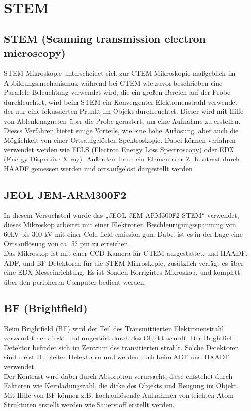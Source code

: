 \section{STEM}

\subsection{STEM (Scanning transmission electron microscopy)}

STEM-Mikroskopie unterscheidet sich zur CTEM-Mikroskopie maßgeblich im Abbildungsmechanismus, während bei CTEM wie zuvor beschrieben eine Parallele Beleuchtung verwendet wird, die ein großen Bereich auf der Probe durchleuchtet, wird beim STEM ein Konvergenter Elektronenstrahl verwendet der nur eine fokussierten Prunkt im Objekt durchleuchtet. Dieser wird mit Hilfe von Ablenkmagneten über die Probe gerastert, um eine Aufnahme zu erstellen. Dieses Verfahren bietet einige Vorteile, wie eine hohe Auflösung, aber auch die Möglichkeit von einer Ortsaufgelösten Spektroskopie. Dabei können verfahren verwendet werden wie EELS (Electron Energy Loss Spectroscopy) oder EDX (Energy Dispersive X-ray). Außerdem kann ein Elementarer Z- Kontrast durch HAADF gemessen werden und ortsaufgelöst dargestellt werden.

\subsection{JEOL JEM-ARM300F2}
In diesem Versuchsteil wurde das „JEOL JEM-ARM300F2 STEM“ verwendet, dieses Mikroskop arbeitet mit einer Elektronen Beschleunigungsspannung von 60kV bis 300 kV mit einer Cold field emission gun. Dabei ist es in der Lage eine Ortsauflösung von ca. 53 pm zu erreichen.\\
Das Mikroskop ist mit einer CCD Kamera für CTEM ausgestattet, und HAADF, ADF, und BF Detektoren für die STEM Mikroskopie, zusätzlich verfügt es über eine EDX Messeinrichtung. Es ist Sonden-Korrigirtes Mikroskop, und komplett über den peripheren Computer bedient werden.

\subsection{BF (Brightfield)}
Beim Brightfield (BF) wird der Teil des Transmittierten Elektronenstrahl verwendet der direkt und ungestört durch das Objekt schralt. Der Brightfield Detektor befindet sich im Zentrum des transitierten strahlt. Solche Detektoren sind meist Halbleiter Detektoren und werden auch beim ADF und HAADF verwendet. \\
Der Kontrast wird dabei durch Absorption verursacht, diese entstehet durch Faktoren wie Kernladungszahl, die dicke des Objekts und Beugung im Objekt. Mit Hilfe von BF können z.B. hochauflösende Aufnahmen von leichten Atom Strukturen erstellt werden wie Sauerstoff erstellt werden.

